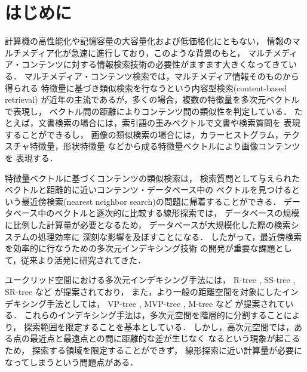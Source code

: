 

\maketitle

\section{はじめに}
\thispagestyle{empty}
計算機の高性能化や記憶容量の大容量化および低価格化にともない，
情報のマルチメディア化が急速に進行しており，このような背景のもと，
マルチメディア・コンテンツに対する情報検索技術の必要性がますます大きくなってきている．
マルチメディア・コンテンツ検索では，マルチメディア情報そのものから得られる
特徴量に基づき類似検索を行なうという内容型検索(content-based retrieval)
が近年の主流であるが，多くの場合，複数の特徴量を多次元ベクトルで表現し，
ベクトル間の距離によりコンテンツ間の類似性を判定している．
たとえば，文書検索の場合には，索引語の重みベクトルで文書や検索質問を
表現することができるし\cite{Salton75,Sasaki01}，
画像の類似検索の場合には，カラーヒストグラム，テクスチャ特徴量，形状特徴量
などから成る特徴量ベクトルにより画像コンテンツを
表現する\cite{Flickner95,Pentland96}．

特徴量ベクトルに基づくコンテンツの類似検索は，
検索質問として与えられたベクトルと距離的に近いコンテンツ・データベース中の
ベクトルを見つけるという最近傍検索(nearest neighbor search)の問題に帰着することができる．
データベース中のベクトルと逐次的に比較する線形探索では，
データベースの規模に比例した計算量が必要となるため，
データベースが大規模化した際の検索システムの処理効率に
深刻な影響を及ぼすことになる．
したがって，最近傍検索を効率的に行なうための多次元インデキシング技術
の開発が重要な課題として，従来より活発に研究されてきた\cite{Katayama01,Gaede98}．

ユークリッド空間における多次元インデキシング手法には，
R-tree \cite{Guttman84}, SS-tree \cite{White96}, SR-tree \cite{Katayama97} など
が提案されており，
また，より一般の距離空間を対象にしたインデキシング手法としては，
VP-tree \cite{Yianilos93}, MVP-tree \cite{Bozkaya99}, M-tree \cite{Ciaccia97} など
が提案されている．
これらのインデキシング手法は，多次元空間を階層的に分割することにより，
探索範囲を限定することを基本としている．
しかし，高次元空間では，ある点の最近点と最遠点との間に距離的な差が生じなく
なるという現象が起こるため\cite{Aggarwal01,Beyer99}，
探索する領域を限定することができず，
線形探索に近い計算量が必要になってしまうという問題点がある．

